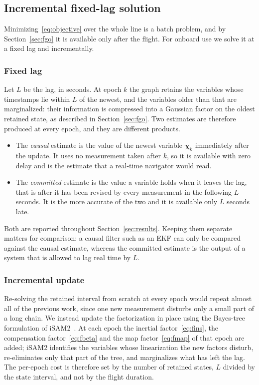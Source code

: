 \subsection{Incremental fixed-lag solution}\label{sec:incremental}
Minimizing~\eqref{eq:objective} over the whole line is a batch problem, and by
Section~\ref{sec:fgo} it is available only after the flight. For onboard use we
solve it at a fixed lag and incrementally.

\subsubsection{Fixed lag}
Let $L$ be the lag, in seconds. At epoch $k$ the graph retains the variables
whose timestamps lie within $L$ of the newest, and the variables older than that
are marginalized: their information is compressed into a Gaussian factor on the
oldest retained state, as described in Section~\ref{sec:fgo}. Two estimates are
therefore produced at every epoch, and they are different products.
\begin{itemize}
\item The \emph{causal} estimate is the value of the newest variable
$\boldsymbol{\chi}_k$ immediately after the update. It uses no measurement taken
after $k$, so it is available with zero delay and is the estimate that a
real-time navigator would read.
\item The \emph{committed} estimate is the value a variable holds when it leaves
the lag, that is after it has been revised by every measurement in the following
$L$ seconds. It is the more accurate of the two and it is available only $L$
seconds late.
\end{itemize}
Both are reported throughout Section~\ref{sec:results}. Keeping them separate
matters for comparison: a causal filter such as an EKF can only be compared
against the causal estimate, whereas the committed estimate is the output of a
system that is allowed to lag real time by $L$.

\subsubsection{Incremental update}
Re-solving the retained interval from scratch at every epoch would repeat almost
all of the previous work, since one new measurement disturbs only a small part
of a long chain. We instead update the factorization in place using the
Bayes-tree formulation of iSAM2~\cite{kaess2012}. At each epoch the inertial
factor~\eqref{eq:fins}, the compensation factor~\eqref{eq:fbeta} and the map
factor~\eqref{eq:fmap} of that epoch are added; iSAM2 identifies the variables
whose linearization the new factors disturb, re-eliminates only that part of the
tree, and marginalizes what has left the lag. The per-epoch cost is therefore
set by the number of retained states, $L$ divided by the state interval, and not
by the flight duration.

